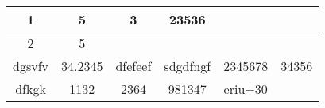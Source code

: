 \documentclass{article}
\begin{document}
\begin{tabular}{ |c|c|c|c|c|c| }
\hline
1 & 5 & 3 & 23536 &  &  \\
\hline
2 & 5 &  &  &  &  \\
\hline
dgsvfv & 34.2345 & dfefeef & sdgdfngf & 2345678 & 34356 \\
\hline
dfkgk & 1132 & 2364 & 981347 & eriu+30 &  \\
\hline
\end{tabular}
\end{document}
